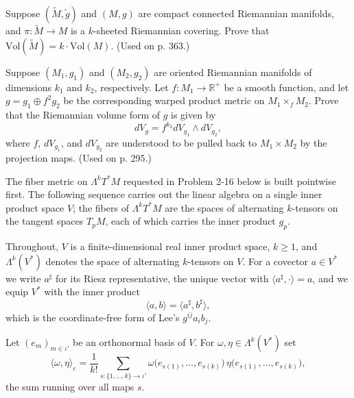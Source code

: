 \begin{exercise}
\label{prob:covering-volume-form}
Suppose $(\tilde{M}, \tilde{g})$ and $(M, g)$ are compact connected Riemannian manifolds, and $\pi : \tilde{M} \to M$ is a $k$-sheeted Riemannian covering. Prove that $\text{Vol}(\tilde{M}) = k \cdot \text{Vol}(M)$. (Used on p. 363.)
\end{exercise}

\begin{exercise}
\label{prob:warped-product-volume-form}
Suppose $(M_1, g_1)$ and $(M_2, g_2)$ are oriented Riemannian manifolds of dimensions $k_1$ and $k_2$, respectively. Let $f : M_1 \to \mathbb{R}^+$ be a smooth function, and let $g = g_1 \oplus f^2 g_2$ be the corresponding warped product metric on $M_1 \times_f M_2$. Prove that the Riemannian volume form of $g$ is given by
\[
dV_g = f^{k_2} dV_{g_1} \wedge dV_{g_2},
\]
where $f$, $dV_{g_1}$, and $dV_{g_2}$ are understood to be pulled back to $M_1 \times M_2$ by the projection maps. (Used on p. 295.)
\end{exercise}

The fiber metric on $\Lambda^k T^* M$ requested in Problem 2-16 below is built pointwise first. The following sequence carries out the linear algebra on a single inner product space $V$; the fibers of $\Lambda^k T^*M$ are the spaces of alternating $k$-tensors on the tangent spaces $T_pM$, each of which carries the inner product $g_p$.

Throughout, $V$ is a finite-dimensional real inner product space, $k \ge 1$, and $\Lambda^k(V^*)$ denotes the space of alternating $k$-tensors on $V$. For a covector $a \in V^*$ we write $a^\sharp$ for its Riesz representative, the unique vector with $\langle a^\sharp, \cdot\rangle = a$, and we equip $V^*$ with the inner product
\begin{equation}
\langle a, b \rangle = \langle a^\sharp, b^\sharp \rangle, \tag{2.26a}
\end{equation}
which is the coordinate-free form of Lee's $g^{ij}a_i b_j$.

\begin{definition}
\label{def:inner-k-covectors}
\leanok
Let $(e_m)_{m \in \iota'}$ be an orthonormal basis of $V$. For $\omega, \eta \in \Lambda^k(V^*)$ set
\[
\langle \omega, \eta \rangle_e = \frac{1}{k!} \sum_{s \colon \{1,\ldots,k\} \to \iota'} \omega\big(e_{s(1)}, \ldots, e_{s(k)}\big)\, \eta\big(e_{s(1)}, \ldots, e_{s(k)}\big),
\]
the sum running over all maps $s$.
\end{definition}

